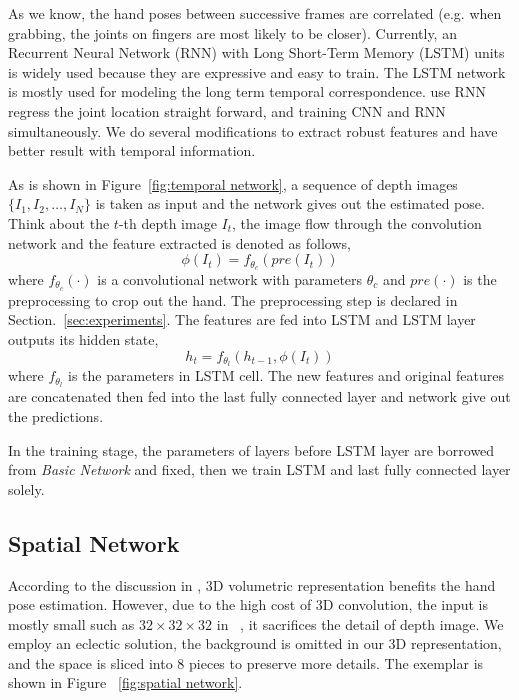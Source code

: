 \documentclass[journal,comsoc]{IEEEtran}
\begin{document}
As we know, the hand poses between successive frames are correlated (e.g. when grabbing, the joints
on fingers are most likely to be closer). Currently, an Recurrent Neural Network (RNN) with Long
Short-Term Memory (LSTM) units~\cite{zaremba2014learning} is widely used because they are expressive
and easy to train. The LSTM network is mostly used for modeling the long term temporal correspondence.
\cite{quach2016depth} use RNN regress the joint location straight forward, and training CNN and RNN
simultaneously. We do several modifications to extract robust features and have better result with
temporal information.

As is shown in Figure~\ref{fig:temporal network}, a sequence of depth images $\{I_1, I_2, \dots, I_N\}$ is
taken as input and the network gives out the estimated pose. Think about the $t$-th depth image $I_t$,
the image flow through the convolution network and the feature extracted is denoted as follows,
\begin{equation}
\phi(I_t)=f_{\theta_c}(pre(I_t))
\end{equation}
where $f_{\theta_c}(\cdot)$ is a convolutional network with parameters $\theta_c$ and
$pre(\cdot)$ is the preprocessing to crop out the hand. The preprocessing step is declared
in Section.~\ref{sec:experiments}. The features are fed into LSTM and LSTM layer outputs its hidden
state,
\begin{equation}
h_t=f_{\theta_l}(h_{t-1}, \phi(I_t))
\end{equation}
where $f_{\theta_l}$ is the parameters in LSTM cell. The new features and original features
are concatenated then fed into the last fully connected layer and network give out the predictions.

In the training stage, the parameters of layers before LSTM layer are borrowed from \emph{Basic Network}
and fixed, then we train LSTM and last fully connected layer solely.

\subsection{Spatial Network}\label{sec:spatial network}
According to the discussion in \cite{supancic2015depth, deng2017hand3d, ge2017_3D}, 3D
volumetric representation benefits the hand pose estimation. However, due to the high
cost of 3D convolution, the input is mostly small such as $32 \times 32 \times 32$ in
~\cite{deng2017hand3d, ge2017_3D}, it sacrifices the detail of depth image. We employ
an eclectic solution, the background is omitted in our 3D representation, and the space
is sliced into 8 pieces to preserve more details. The exemplar is shown in Figure
~\ref{fig:spatial network}.
\end{document}

